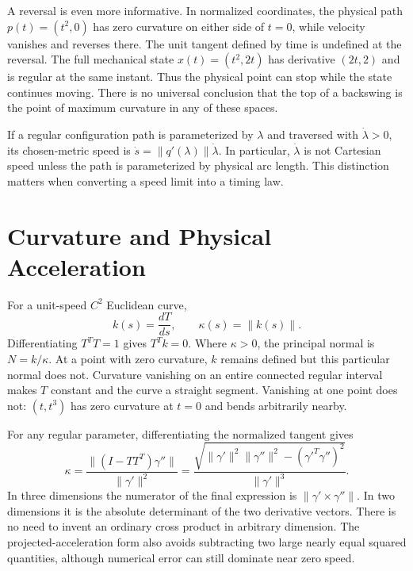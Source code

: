 \documentclass[12pt, openany]{book}
\theoremstyle{plain}
\begin{document}
A reversal is even more informative. In normalized coordinates, the physical path
$p(t)=(t^2,0)$ has zero curvature on either side of $t=0$, while velocity
vanishes and reverses there. The unit tangent defined by time is undefined
at the reversal. The full mechanical state
$x(t)=(t^2,2t)$ has derivative $(2t,2)$ and is regular at the same instant.
Thus the physical point can stop while the state continues moving. There is
no universal conclusion that the top of a backswing is the point of maximum
curvature in any of these spaces.

If a regular configuration path is parameterized by $\lambda$ and traversed
with $\dot\lambda>0$, its chosen-metric speed is
$\dot s=\|q'(\lambda)\|\dot\lambda$. In particular, $\dot\lambda$ is not
Cartesian speed unless the path is parameterized by physical arc length.
This distinction matters when converting a speed limit into a timing law.

\section{Curvature and Physical Acceleration}

For a unit-speed $C^2$ Euclidean curve,
\begin{equation}\label{eq:curvature_def}
 k(s)=\frac{dT}{ds},\qquad \kappa(s)=\|k(s)\|.
\end{equation}
Differentiating $T^TT=1$ gives $T^Tk=0$. Where $\kappa>0$, the principal
normal is $N=k/\kappa$. At a point with zero curvature, $k$ remains defined
but this particular normal does not. Curvature vanishing on an entire
connected regular interval makes $T$ constant and the curve a straight
segment. Vanishing at one point does not: $(t,t^3)$ has zero curvature at
$t=0$ and bends arbitrarily nearby.

For any regular parameter, differentiating the normalized tangent gives
\begin{equation}\label{eq:curvature_general_n}
 \kappa=\frac{\|(I-TT^T)\gamma''\|}{\|\gamma'\|^2}
 =\frac{\sqrt{\|\gamma'\|^2\|\gamma''\|^2-(\gamma'^T\gamma'')^2}}
 {\|\gamma'\|^3}.
\end{equation}
In three dimensions the numerator of the final expression is
$\|\gamma'\times\gamma''\|$. In two dimensions it is the absolute determinant
of the two derivative vectors. There is no need to invent an ordinary cross
product in arbitrary dimension. The projected-acceleration form also avoids
subtracting two large nearly equal squared quantities, although numerical
error can still dominate near zero speed.
\end{document}
